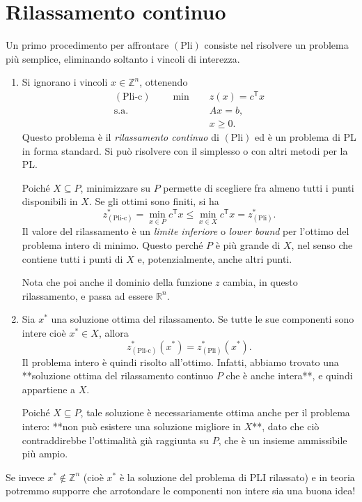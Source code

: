 \newpage

\section{Rilassamento continuo}
\label{sec:rilassamento-continuo}

Un primo procedimento per affrontare \((\mathrm{Pli})\) consiste
nel risolvere un problema più semplice, eliminando soltanto
i vincoli di interezza.

\begin{enumerate}
\item Si ignorano i vincoli \(x\in\mathbb Z^n\), ottenendo
\begin{align*}
(\mathrm{Pli\text{-}c})\qquad \min\quad &z(x)=c^{\mathsf T}x\\
\text{s.a.}\quad &Ax=b,\\
&x\geq0.
\end{align*}
Questo problema è il \emph{rilassamento continuo} di
\((\mathrm{Pli})\) ed è un problema di PL in forma standard.
Si può risolvere con il simplesso o con altri metodi per la PL.

Poiché \(X\subseteq P\), minimizzare su \(P\) permette di scegliere
fra almeno tutti i punti disponibili in \(X\). Se gli ottimi
sono finiti, si ha
\[
z^*_{(\mathrm{Pli\text{-}c})}
=\min_{x\in P}c^{\mathsf T}x
\leq\min_{x\in X}c^{\mathsf T}x
=z^*_{(\mathrm{Pli})}.
\]
Il valore del rilassamento è un \emph{limite inferiore}
o \emph{lower bound} per l'ottimo del problema intero di minimo.
Questo perché \(P\) è più grande di \(X\), nel senso che contiene tutti i punti di \(X\) e, potenzialmente, anche altri punti.
\begin{warning}{}
    Nota che poi anche il dominio della funzione \(z\) cambia, in questo rilassamento, e passa ad essere \(\mathbb{R}^n\).
\end{warning}

\item Sia \(x^*\) una soluzione ottima del rilassamento.
Se tutte le sue componenti sono intere cioè \(x^*\in X\), allora
\[
z^*_{(\mathrm{Pli\text{-}c})}(x^*)
=z^*_{(\mathrm{Pli})}(x^*).
\]
Il problema intero è quindi risolto all'ottimo. Infatti, abbiamo trovato una **soluzione ottima del rilassamento continuo \(P\) che è anche intera**, e quindi appartiene a \(X\).

Poiché \(X\subseteq P\), tale soluzione è necessariamente ottima anche per il problema intero: **non può esistere una soluzione migliore in \(X\)**, dato che ciò contraddirebbe l'ottimalità già raggiunta su \(P\), che è un insieme ammissibile più ampio.
\end{enumerate}
\newpage
Se invece \(x^*\notin\mathbb Z^n\) (cioè $x^*$ è la soluzione del problema di PLI rilassato) e in teoria potremmo supporre che arrotondare le componenti non intere sia una buona idea!
\\


